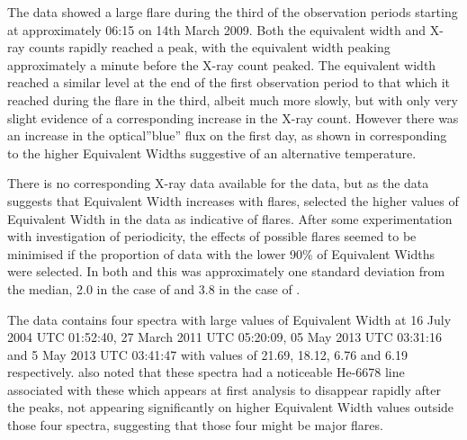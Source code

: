 
The {\uves} data showed a large flare during the third of the observation periods starting at approximately 06:15 on
14th March 2009. Both the equivalent width and X-ray counts rapidly reached a peak, with the equivalent width peaking
approximately a minute before the X-ray count peaked. The equivalent width reached a similar level at the end of the
first observation period to that which it reached during the flare in the third, albeit much more slowly, but with only
very slight evidence of a corresponding increase in the X-ray count. However there was an increase in the {\uves}
optical''blue'' flux on the first day, as shown in \citet[fig. 1]{fuhrmeister11} corresponding to the higher Equivalent
Widths suggestive of an alternative temperature.

There is no corresponding X-ray data available for the {\harps} data, but as the {\uves} data suggests that {\ha}
Equivalent Width increases with flares, {\Firstp} selected the higher values of Equivalent Width in the {\harps} data as
indicative of flares. After some experimentation with investigation of periodicity, the effects of possible flares seemed to be
minimised if the proportion of data with the lower 90\% of Equivalent Widths were selected. In both {\uves} and {\harps}
this was approximately one standard deviation from the median, 2.0 in the case of {\uves} and 3.8 in the case of
{\harps}.

The {\harps} data contains four spectra with large values of Equivalent Width at 16 July 2004 UTC 01:52:40, 27 March
2011 UTC 05:20:09, 05 May 2013 UTC 03:31:16 and 5 May 2013 UTC 03:41:47 with values of 21.69, 18.12, 6.76 and 6.19
respectively.  {\FirstP} also noted that these spectra had a noticeable He-6678 line associated with these which appears
at first analysis to disappear rapidly after the peaks, not appearing significantly on higher {\ha} Equivalent Width
values outside those four spectra, suggesting that those four might be major flares.
